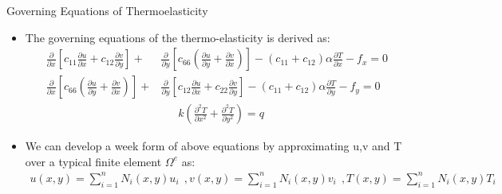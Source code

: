 \documentclass{beamer}
\begin{document}
   \begin{frame}[t,fragile]{Governing Equations of Thermoelasticity}
    \begin{itemize}
         \item The governing equations of the thermo-elasticity is derived as: 
            \bgroup
            \footnotesize
            \begin{align*}
    \frac{\partial}{\partial x}\left[c_{11}\frac{\partial u}{\partial x}+c_{12}\frac{\partial v}{\partial y}\right]+&\frac{\partial}{\partial y}\left[c_{66}\left(\frac{\partial u}{\partial y}+\frac{\partial v}{\partial x}\right)\right]-(c_{11}+c_{12})\alpha\frac{\partial T}{\partial x}-f_x   =0 \\
    \frac{\partial}{\partial x}\left[c_{66}\left(\frac{\partial u}{\partial y}+\frac{\partial v}{\partial x}\right)\right]+&\frac{\partial}{\partial y}\left[c_{12}\frac{\partial u}{\partial x}+c_{22}\frac{\partial v}{\partial y}\right]-(c_{11}+c_{12})\alpha\frac{\partial T}{\partial y}-f_y=0\\
    &\ \ \ \ \ \ \ k\left( \frac{\partial^2 T}{\partial x^2}+\frac{\partial^2 T}{\partial y^2} \right)=q
\end{align*}
\egroup
       \item We can develop a week form of above equations by approximating u,v and T over a typical finite element $\Omega^e$ as:
          \footnotesize
\begin{align*}
    u(x,y)=\sum_{i=1}^nN_i (x,y)u_i\ \ , 
    v(x,y)=\sum_{i=1}^nN_i (x,y)v_i\ \ ,
    T(x,y)=\sum_{i=1}^nN_i (x,y)T_i
\end{align*}
\end{itemize}
\end{frame}
\end{document}
